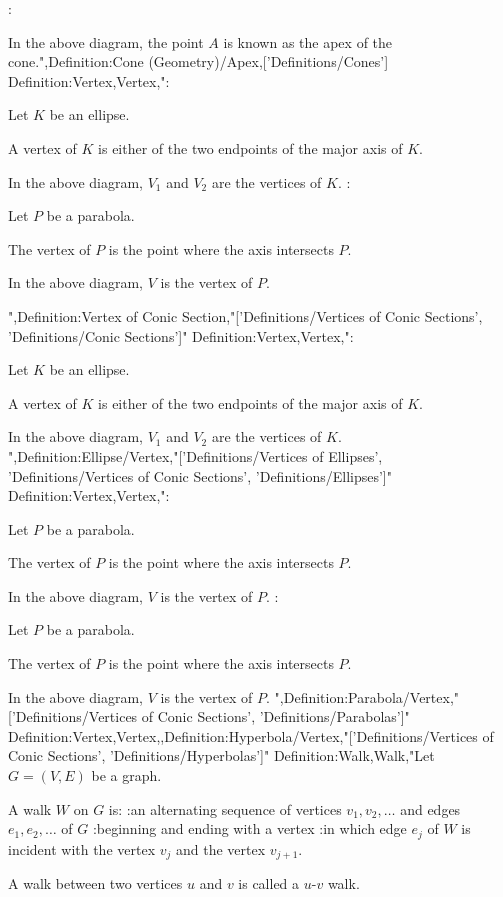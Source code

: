 :


In the above diagram, the point $A$ is known as the apex of the cone.",Definition:Cone (Geometry)/Apex,['Definitions/Cones']
Definition:Vertex,Vertex,":


Let $K$ be an ellipse.

A vertex of $K$ is either of the two endpoints of the major axis of $K$.


In the above diagram, $V_1$ and $V_2$ are the vertices of $K$.
:


Let $P$ be a parabola.

The vertex of $P$ is the point where the axis intersects $P$.


In the above diagram, $V$ is the vertex of $P$.

",Definition:Vertex of Conic Section,"['Definitions/Vertices of Conic Sections', 'Definitions/Conic Sections']"
Definition:Vertex,Vertex,":


Let $K$ be an ellipse.

A vertex of $K$ is either of the two endpoints of the major axis of $K$.


In the above diagram, $V_1$ and $V_2$ are the vertices of $K$.
",Definition:Ellipse/Vertex,"['Definitions/Vertices of Ellipses', 'Definitions/Vertices of Conic Sections', 'Definitions/Ellipses']"
Definition:Vertex,Vertex,":


Let $P$ be a parabola.

The vertex of $P$ is the point where the axis intersects $P$.


In the above diagram, $V$ is the vertex of $P$.
:


Let $P$ be a parabola.

The vertex of $P$ is the point where the axis intersects $P$.


In the above diagram, $V$ is the vertex of $P$.
",Definition:Parabola/Vertex,"['Definitions/Vertices of Conic Sections', 'Definitions/Parabolas']"
Definition:Vertex,Vertex,,Definition:Hyperbola/Vertex,"['Definitions/Vertices of Conic Sections', 'Definitions/Hyperbolas']"
Definition:Walk,Walk,"Let $G = \left( V, E \right)$ be a graph.

A walk $W$ on $G$ is:
:an alternating sequence of vertices $v_1, v_2, \ldots$ and edges $e_1, e_2, \ldots$ of $G$
:beginning and ending with a vertex
:in which edge $e_j$ of $W$ is incident with the vertex $v_j$ and the vertex $v_{j + 1}$.


A walk between two vertices $u$ and $v$ is called a $u$-$v$ walk.


